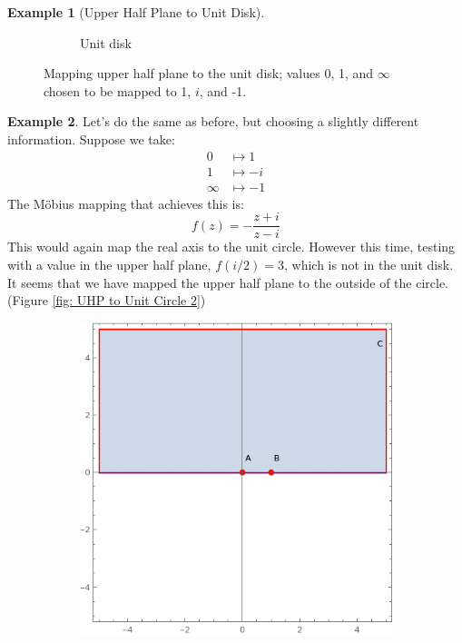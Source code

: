 \documentclass[a4paper, 12pt]{article}
\theoremstyle{definition}
\newtheorem{example}{Example}
\numberwithin{theorem}{section}
\numberwithin{definition}{section}
\numberwithin{exercise}{section}
\numberwithin{remark}{section}
\numberwithin{figure}{section}
\numberwithin{example}{section}
\begin{document}
\begin{example}[Upper Half Plane to Unit Disk]
\begin{figure}[tbp]
\begin{subfigure}[b]{0.5\textwidth}
            \caption{Unit disk}
        \end{subfigure}
        \caption{Mapping upper half plane to the unit disk; values 0, 1, and $\infty$ chosen to be mapped to 1, $i$, and -1.}
        \label{fig: UHP to Unit Circle}
    \end{figure}
\end{example}
\begin{example}
    Let's do the same as before, but choosing a slightly different information.
    Suppose we take:
    \begin{align*}
        0 &\mapsto 1 \\
        1 &\mapsto -i \\
        \infty &\mapsto -1
    \end{align*}
    The M\"obius mapping that achieves this is:
    \begin{equation*}
        f(z) = -\frac{z+i}{z-i}
    \end{equation*}
    This would again map the real axis to the unit circle.
    However this time, testing with a value in the upper half plane, $f(i/2) = 3$,
    which is not in the unit disk.
    It seems that we have mapped the upper half plane to the outside of the circle.
    (Figure \ref{fig: UHP to Unit Circle 2})
    \begin{figure}[tbp]
        \centering
        \begin{subfigure}[b]{0.5\textwidth}
            \centering
            \includegraphics[width=\textwidth]{UpperHalfPlane}

\end{subfigure}
\end{figure}
\end{example}
\end{document}
